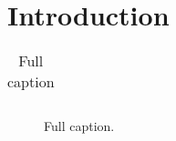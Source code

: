 \documentclass[pdf,12pt,report,strict]{SANDreport}
\begin{document}
    \SANDmain		%

    \chapter{Introduction}\label{Intro}

	\begin{table}[ht]
	    \centering
	    \caption[Short Title]{Full caption}
	    \bigskip

	    \begin{tabular}{|l|c|l|c|}
	    \end{tabular}
	    \label{tab:1}
	\end{table}

	\begin{figure}[ht]
	    \centering
	    \caption{Full caption.}
	    \label{fig:1}
	\end{figure}



    \clearpage
    \providecommand*{\phantomsection}{}
    \phantomsection
    
    


    \appendix
    \chapter{}


    \begin{SANDdistribution}[NM]%

	\SANDdistExternal{}{}
	\bigskip


	\SANDdistInternal{}{}{}{}

	\SANDdistInternalM{}{}{}{}
    \end{SANDdistribution}


\end{document}
